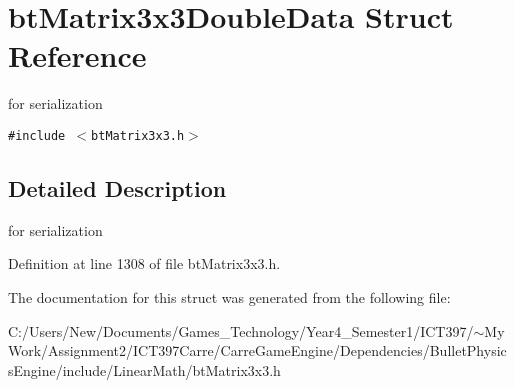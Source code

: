 \hypertarget{structbt_matrix3x3_double_data}{
\section{btMatrix3x3DoubleData Struct Reference}
\label{structbt_matrix3x3_double_data}
}
for serialization  


{\tt \#include $<$btMatrix3x3.h$>$}



\subsection{Detailed Description}
for serialization 

Definition at line 1308 of file btMatrix3x3.h.

The documentation for this struct was generated from the following file:\begin{CompactItemize}
\item 
C:/Users/New/Documents/Games\_\-Technology/Year4\_\-Semester1/ICT397/$\sim$My Work/Assignment2/ICT397Carre/CarreGameEngine/Dependencies/BulletPhysicsEngine/include/LinearMath/btMatrix3x3.h\end{CompactItemize}
